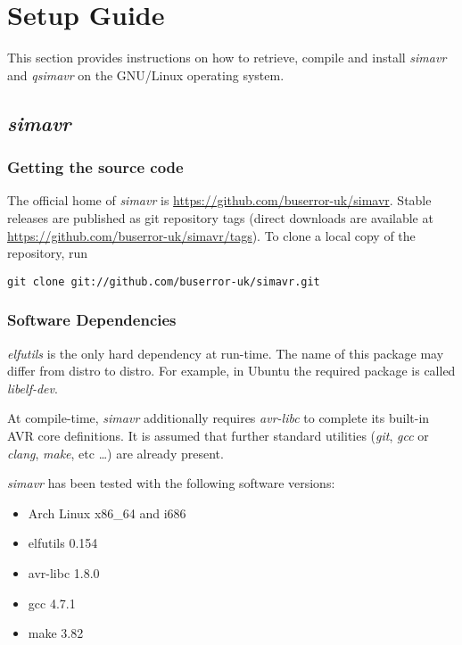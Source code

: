 
\chapter{Setup Guide}

This section provides instructions on how to retrieve, compile and install
\emph{simavr} and \emph{qsimavr} on the GNU/Linux operating system.

\section{\emph{simavr}}

\subsection{Getting the source code}

The official home of \emph{simavr} is \url{https://github.com/buserror-uk/simavr}.
Stable releases are published as git repository tags (direct downloads are
available at \url{https://github.com/buserror-uk/simavr/tags}). To clone a local
copy of the repository, run

\begin{verbatim}
git clone git://github.com/buserror-uk/simavr.git
\end{verbatim}

\subsection{Software Dependencies}

\emph{elfutils} is the only hard dependency at run-time. The name of this
package may differ from distro to distro. For example, in Ubuntu the required
package is called \emph{libelf-dev}.

At compile-time, \emph{simavr} additionally requires \emph{avr-libc} to complete its
built-in AVR core definitions. It is assumed that further standard
utilities (\emph{git}, \emph{gcc} or \emph{clang}, \emph{make}, etc \ldots) are
already present.

\emph{simavr} has been tested with the following software versions:

\begin{itemize}
\item Arch Linux x86\_64 and i686
\item elfutils 0.154
\item avr-libc 1.8.0
\item gcc 4.7.1
\item make 3.82
\end{itemize}

